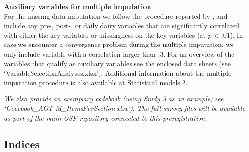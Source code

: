 \documentclass[]{article}
\begin{document}
\textbf{Auxiliary variables for multiple imputation}\\
For the missing data imputation we follow the procedure reported by
\citet{Monden2015}, and include any pre-, post-, or daily dairy
variables that are significantly correlated with either the key
variables or missingness on the key variables (at \(p\) \textless{}
.01). In case we encounter a convergence problem during the multiple
imputation, we only include variable with a correlation larger than .3.
For an overview of the variables that qualify as auxiliary variables see
the enclosed data sheets (see `VariableSelectionAnalyses.xlsx').
Additional information about the multiple imputation procedure is also
available at \protect\hyperlink{statistical-models}{Statistical models}
2.

\emph{We also provide an exemplary codebook (using Study 3 as an
example; see `Codebook\_AOT-M\_ItemsPerSection.xlsx'). The full survey
files will be available as part of the main OSF repository connected to
this preregistration.}

\hypertarget{indices}{%
\subsection{Indices}\label{indices}}
\end{document}

